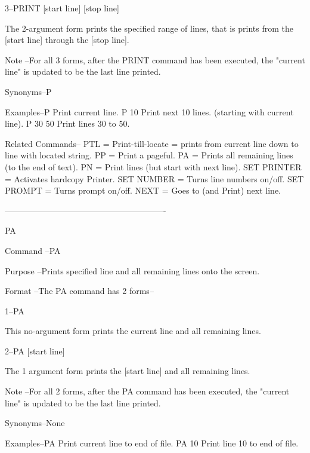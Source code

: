        3--PRINT    [start line]    [stop line]
 
          The 2-argument form prints the specified
          range of lines, that is prints from the
          [start line]     through the     [stop line].
 
Note    --For all 3 forms, after the PRINT command
          has been executed, the "current line" is
          updated to be the last line printed.
 
Synonyms--P
 
Examples--P        Print current line.
          P 10     Print next 10 lines.
                   (starting with current line).
          P 30 50  Print lines 30 to 50.
 
Related Commands--
          PTL             = Print-till-locate =
                            prints from current line down
                            to line with located string.
          PP              = Print a pageful.
          PA              = Prints all remaining lines
                            (to the end of text).
          PN              = Print lines (but start
                            with next line).
          SET PRINTER     = Activates hardcopy Printer.
          SET NUMBER      = Turns line numbers on/off.
          SET PROMPT      = Turns prompt on/off.
          NEXT            = Goes to (and Print) next line.
 
----------------------------------------------------------
 
PA
 
Command --PA
 
Purpose --Prints specified line and all
          remaining lines onto the screen.
 
Format  --The PA command has 2 forms--
 
       1--PA
 
          This no-argument form prints the
          current line and all remaining lines.
 
       2--PA [start line]
 
          The 1 argument form prints the [start line]
          and all remaining lines.
 
Note    --For all 2 forms, after the PA command
          has been executed, the "current line" is
          updated to be the last line printed.
 
Synonyms--None
 
Examples--PA       Print current line to end of file.
          PA 10    Print line 10 to end of file.
 
